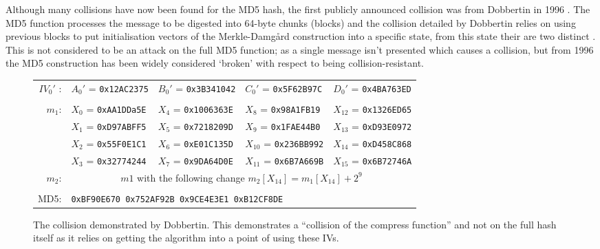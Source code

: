 \documentclass[a4paper,12pt]{article}
\begin{document}
Although many collisions have now been found for the MD5 hash, the first publicly announced collision was from Dobbertin in 1996 \cite{dobbertin}. The MD5 function processes the message to be digested into 64-byte chunks (blocks) and the collision detailed by Dobbertin relies on using previous blocks to put initialisation vectors of the Merkle-Damgård construction into a specific state, from this state their are two distinct . This is not considered to be an attack on the full MD5 function; as a single message isn’t presented which causes a collision, but from 1996 the MD5 construction has been widely considered `broken’ with respect to being collision-resistant.

\begin{figure}
\begin{tabular}{|r|  l l l l|}
	$IV_0'$ :& $A_0'$ = \texttt{0x12AC2375}& $B_0'$ = \texttt{0x3B341042}& $C_0'$ = \texttt{0x5F62B97C}& $D_0'$ = \texttt{0x4BA763ED}\\& & & &\\
	$m_1$:& $X_0$ = \texttt{0xAA1DDa5E} & $X_4$ = \texttt{0x1006363E} & $X_8$ = \texttt{0x98A1FB19} & $X_{12}$ = \texttt{0x1326ED65} \\
	& $X_1$ = \texttt{0xD97ABFF5} & $X_5$ = \texttt{0x7218209D} & $X_9$ = \texttt{0x1FAE44B0} & $X_{13}$ = \texttt{0xD93E0972} \\
	& $X_2$ = \texttt{0x55F0E1C1} & $X_6$ = \texttt{0xE01C135D} & $X_{10}$ = \texttt{0x236BB992} & $X_{14}$ = \texttt{0xD458C868} \\
	& $X_3$ = \texttt{0x32774244} & $X_7$ = \texttt{0x9DA64D0E} & $X_{11}$ = \texttt{0x6B7A669B} & $X_{15}$ = \texttt{0x6B72746A} \\
	$m_2$: & \multicolumn{4}{c|}{$m1$ with the following change $m_2[X_{14}] = m_1[X_{14}] + 2^9$ }\\& & & &\\
	MD5: & \multicolumn{4}{l|}{\texttt{0xBF90E670 0x752AF92B 0x9CE4E3E1 0xB12CF8DE}}
\end{tabular}
\caption{The collision demonstrated by Dobbertin\cite{dobbertin}. This demonstrates a ``collision of the compress function'' and not on the full hash itself as it relies on getting the algorithm into a point of using these IVs.}

\end{figure}
\end{document}
